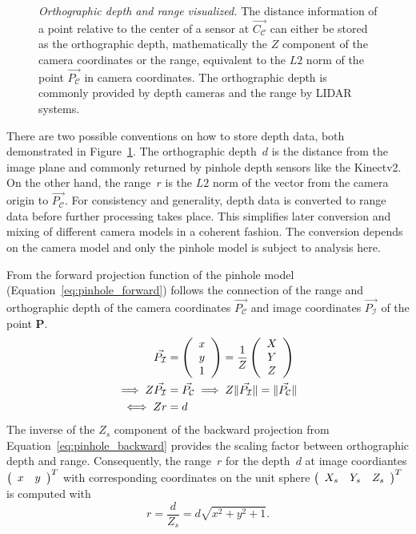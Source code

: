 \begin{figure}[H]
    \scalebox{0.8}{%
    
    }
    \caption[Orthographic depth and range visualized]{\emph{Orthographic depth and range visualized.} The distance information of a point relative to the center of a sensor at $\vec{C_\mathcal{C}}$ can either be stored as the orthographic depth, mathematically the $Z$ component of the camera coordinates or the range, equivalent to the $L2$ norm of the point $\vec{P_\mathcal{C}}$ in camera coordinates. The orthographic depth is commonly provided by depth cameras and the range by \acrshort{LIDAR} systems.}
    \label{fig:range_depth}
\end{figure}
There are two possible conventions on how to store depth data, both demonstrated in Figure~\ref{fig:range_depth}.
The orthographic depth~$d$ is the distance from the image plane and commonly returned by pinhole depth sensors like the Kinectv2.
On the other hand, the range~$r$ is the $L2$ norm of the vector from the camera origin to $\vec{P_\mathcal{C}}$.
For consistency and generality, depth data is converted to range data before further processing takes place.
This simplifies later conversion and mixing of different camera models in a coherent fashion.
The conversion depends on the camera model and only the pinhole model is subject to analysis here.

From the forward projection function of the pinhole model (Equation~\ref{eq:pinhole_forward}) follows the connection of the range and orthographic depth of the camera coordinates $\vec{P_\mathcal{C}}$ and image coordinates $\vec{P_\mathcal{I}}$ of the point $\mathbf{P}$.
\begin{equation}
\begin{aligned}
    \vec{P_\mathcal{I}} &= \left(\begin{array}{c} x \\ y \\ 1 \end{array}\right) = \frac{1}{Z}\left(\begin{array}{c} X \\ Y \\ Z \end{array}\right) \\
    \implies Z \vec{P_\mathcal{I}} &= \vec{P_\mathcal{C}} \implies Z \lVert\vec{P_\mathcal{I}}\rVert = \lVert\vec{P_\mathcal{C}}\rVert \\
    \iff Z r &= d
\end{aligned}
\end{equation}
The inverse of the $Z_{s}$ component of the backward projection from Equation~\ref{eq:pinhole_backward} provides the scaling factor between orthographic depth and range.
Consequently, the range~$r$ for the depth~$d$ at image coordiantes $\left(\begin{array}{cc} x & y \end{array}\right)^T$ with corresponding coordinates on the unit sphere $\left(\begin{array}{ccc} X_s & Y_s & Z_s \end{array}\right)^T$ is computed with
\begin{equation}
    r = \frac{d}{Z_s} = d \sqrt{x^2 + y^2 + 1}\text{.}
\end{equation}
